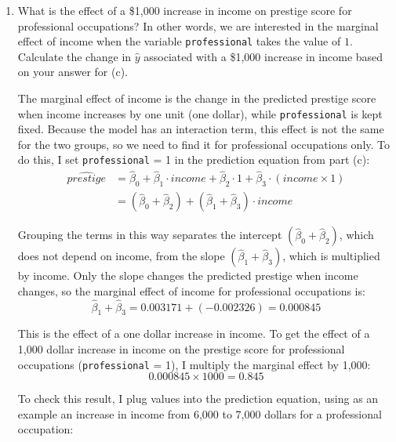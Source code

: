 \documentclass[12pt,letterpaper]{article}
\begin{document}
\begin{enumerate}
	\vspace{1cm}	
	\item [(f)]
	What is the effect of a \$1,000 increase in income on prestige score for professional occupations? In other words, we are interested in the marginal effect of income when the variable \texttt{professional} takes the value of $1$. Calculate the change in $\hat{y}$ associated with a \$1,000 increase in income based on your answer for (c).
	
		\noindent The marginal effect of income is the change in the predicted prestige score when income increases by one unit (one dollar), while \texttt{professional} is kept fixed. Because the model has an interaction term, this effect is not the same for the two groups, so we need to find it for professional occupations only. To do this, I set \texttt{professional} = 1 in the prediction equation from part (c):
	\begin{align*}
		\widehat{prestige} &= \hat{\beta}_0 + \hat{\beta}_1 \cdot income + \hat{\beta}_2 \cdot 1 + \hat{\beta}_3 \cdot (income \times 1) \\
		&= (\hat{\beta}_0 + \hat{\beta}_2) + (\hat{\beta}_1 + \hat{\beta}_3) \cdot income
	\end{align*}
	
	\noindent Grouping the terms in this way separates the intercept $(\hat{\beta}_0 + \hat{\beta}_2)$, which does not depend on income, from the slope $(\hat{\beta}_1 + \hat{\beta}_3)$, which is multiplied by income. Only the slope changes the predicted prestige when income changes, so the marginal effect of income for professional occupations is:
	\begin{equation*}
		\hat{\beta}_1 + \hat{\beta}_3 = 0.003171 + (-0.002326) = 0.000845
	\end{equation*}
	
	
	
	\noindent This is the effect of a one dollar increase in income. To get the effect of a 1,000 dollar increase in income on the prestige score for professional occupations (\texttt{professional} = 1), I multiply the marginal effect by 1,000:
	\begin{equation*}
		0.000845 \times 1000 = 0.845
	\end{equation*}
	
	
	
		\noindent To check this result, I plug values into the prediction equation, using as an example an increase in income from 6,000 to 7,000 dollars for a professional occupation:
	

\end{enumerate}
\end{document}
